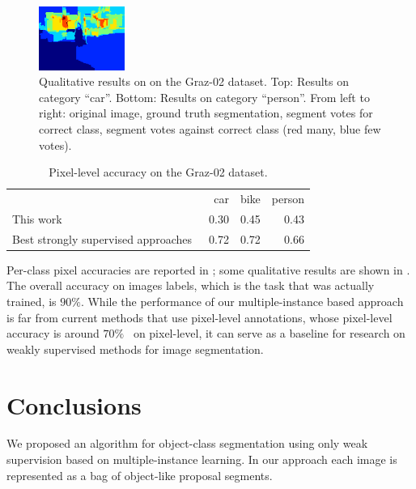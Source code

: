 \documentclass{llncs} %
\begin{document}
\begin{figure}[tbp]
\begin{center}
        \includegraphics[width=28mm]{images/person1_neg.png}\hspace*{0.7ex}
	\end{center}
        \vspace{-2mm}
        \caption{Qualitative results on on the Graz-02 dataset. Top: Results on
        category ``car''. Bottom: Results on category ``person''. From left to
        right: original image, ground truth segmentation, segment votes for
        correct class, segment votes against correct class (red many, blue few votes).}
        \vspace{-0mm}
\end{figure}

\begin{table}
    \centering
    \caption{Pixel-level accuracy on the Graz-02 dataset.}
    \begin{tabularx}{0.8\textwidth}{lRRR}
    \toprule
                & car & bike & person \\
    \cmidrule(l){2-2}
    \cmidrule(l){3-3}
    \cmidrule(l){4-4}
        This work&   0.30&  0.45&  0.43 \\
        Best strongly supervised approaches~\citep{fulkerson2009class,schulz2011}&   0.72&  0.72&  0.66 \\
    \bottomrule
    \end{tabularx}
\end{table}
Per-class pixel accuracies are reported in ; some qualitative results are shown in . The overall
accuracy on images labels, which is the task that was actually trained, is $90\%$.
While the performance of our multiple-instance based approach is far
from current methods that use pixel-level annotations, whose pixel-level accuracy is around $70\%$~\citep{fulkerson2009class,schulz2011} on pixel-level,
it can serve as a baseline for research on weakly supervised methods for image segmentation.

\section{Conclusions}
We proposed an algorithm for object-class segmentation using only weak supervision based on
multiple-instance learning. In our approach each image is represented as a bag of object-like
proposal segments.
\end{document}
